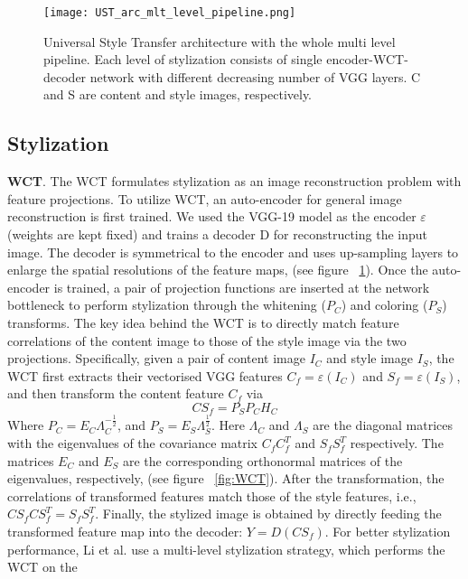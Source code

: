 \begin{figure}[h!]
	\centering
		\texttt{[image: UST\_arc\_mlt\_level\_pipeline.png]}
	\caption{Universal Style Transfer architecture with the whole multi level pipeline. Each level of stylization consists of single encoder-WCT-decoder network with different decreasing number of VGG layers. C and S are content and style images, respectively.
	}
	\label{fig:full-pipeline}
\end{figure}


\subsection{Stylization}
\textbf{WCT}. The WCT \cite{bib11} formulates stylization as an image reconstruction problem with feature projections. To utilize WCT, an auto-encoder for general image reconstruction is first trained. We used the VGG-19 model \cite{bib20} as the encoder $\varepsilon$(weights are kept fixed) and trains a decoder D for reconstructing the input image. The decoder is symmetrical to the encoder and uses up-sampling layers to enlarge the spatial resolutions of the feature maps, (see figure ~\ref{fig:full-pipeline}). Once the auto-encoder is trained, a pair of projection functions are inserted at the network bottleneck to perform stylization through the whitening ($P_C$) and coloring ($P_S$) transforms. The key idea behind the WCT is to directly match feature correlations of the content image to those of the style image via the two projections. Specifically, given a pair of content image $I_C$ and style image $I_S$, the WCT first extracts their vectorised VGG features $C_f=\varepsilon(I_C)$ and $S_f=\varepsilon(I_S)$, and then transform the content feature $C_f$ via
\begin{equation}
CS_f = P_SP_CH_C
\end{equation}
Where $P_C=E_C\Lambda_C^{-\frac{1}{2}}$, and $P_S=E_S\Lambda_S^{\frac{1}{2}}$. Here $\Lambda_C$ and $\Lambda_S$ are the diagonal matrices with the eigenvalues of the covariance matrix $C_fC_f^T$ and $S_fS_f^T$ respectively. The matrices $E_C$ and $E_S$ are the corresponding orthonormal matrices of the eigenvalues, respectively, (see figure ~\ref{fig:WCT}). After the transformation, the correlations of
transformed features match those of the style features, i.e., $CS_fCS_f^T=S_fS_f^T$. Finally, the stylized image is obtained by directly feeding the transformed feature
map into the decoder: $Y = D(CS_f)$. For better stylization performance, Li et
al. \cite{bib11} use a multi-level stylization strategy, which performs the WCT on the
